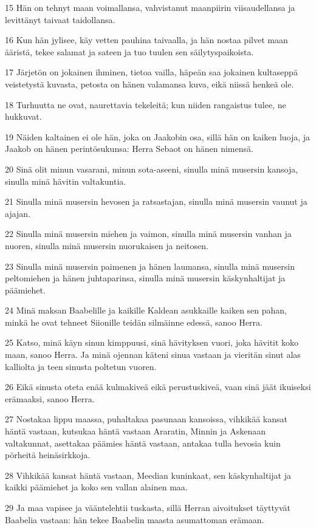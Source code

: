 \par 15 Hän on tehnyt maan voimallansa, vahvistanut maanpiirin viisaudellansa ja levittänyt taivaat taidollansa.
\par 16 Kun hän jylisee, käy vetten pauhina taivaalla, ja hän nostaa pilvet maan ääristä, tekee salamat ja sateen ja tuo tuulen sen säilytyspaikoista.
\par 17 Järjetön on jokainen ihminen, tietoa vailla, häpeän saa jokainen kultaseppä veistetystä kuvasta, petosta on hänen valamansa kuva, eikä niissä henkeä ole.
\par 18 Turhuutta ne ovat, naurettavia tekeleitä; kun niiden rangaistus tulee, ne hukkuvat.
\par 19 Näiden kaltainen ei ole hän, joka on Jaakobin osa, sillä hän on kaiken luoja, ja Jaakob on hänen perintösukunsa: Herra Sebaot on hänen nimensä.
\par 20 Sinä olit minun vasarani, minun sota-aseeni, sinulla minä musersin kansoja, sinulla minä hävitin valtakuntia.
\par 21 Sinulla minä musersin hevosen ja ratsastajan, sinulla minä musersin vaunut ja ajajan.
\par 22 Sinulla minä musersin miehen ja vaimon, sinulla minä musersin vanhan ja nuoren, sinulla minä musersin nuorukaisen ja neitosen.
\par 23 Sinulla minä musersin paimenen ja hänen laumansa, sinulla minä musersin peltomiehen ja hänen juhtaparinsa, sinulla minä musersin käskynhaltijat ja päämiehet.
\par 24 Minä maksan Baabelille ja kaikille Kaldean asukkaille kaiken sen pahan, minkä he ovat tehneet Siionille teidän silmäinne edessä, sanoo Herra.
\par 25 Katso, minä käyn sinun kimppuusi, sinä hävityksen vuori, joka hävitit koko maan, sanoo Herra. Ja minä ojennan käteni sinua vastaan ja vieritän sinut alas kalliolta ja teen sinusta poltetun vuoren.
\par 26 Eikä sinusta oteta enää kulmakiveä eikä perustuskiveä, vaan sinä jäät ikuiseksi erämaaksi, sanoo Herra.
\par 27 Nostakaa lippu maassa, puhaltakaa pasunaan kansoissa, vihkikää kansat häntä vastaan, kutsukaa häntä vastaan Araratin, Minnin ja Askenaan valtakunnat, asettakaa päämies häntä vastaan, antakaa tulla hevosia kuin pörheitä heinäsirkkoja.
\par 28 Vihkikää kansat häntä vastaan, Meedian kuninkaat, sen käskynhaltijat ja kaikki päämiehet ja koko sen vallan alainen maa.
\par 29 Ja maa vapisee ja vääntelehtii tuskasta, sillä Herran aivoitukset täyttyvät Baabelia vastaan: hän tekee Baabelin maasta asumattoman erämaan.
